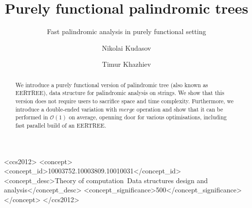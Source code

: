 \documentclass[sigconf]{acmart}
\begin{document}
\title{Purely functional palindromic trees}
\subtitle{Fast palindromic analysis in purely functional setting}


\author{Nikolai Kudasov}

\author{Timur Khazhiev}

\begin{abstract}
  We introduce a purely functional version of
  palindromic tree (also known as EERTREE), data structure
  for palindromic analysis on strings. We show that
  this version does not require users to sacrifice
  space and time complexity. Furthermore, we introduce
  a double-ended variation with $merge$ operation and
  show that it can be performed in $\mathcal{O}(1)$
  on average, openning door for various optimisations,
  including fast parallel build of an EERTREE.
\end{abstract}

%
%
\begin{CCSXML}
<ccs2012>
<concept>
<concept_id>10003752.10003809.10010031</concept_id>
<concept_desc>Theory of computation~Data structures design and analysis</concept_desc>
<concept_significance>500</concept_significance>
</concept>
</ccs2012>
\end{CCSXML}



\maketitle





\end{document}
